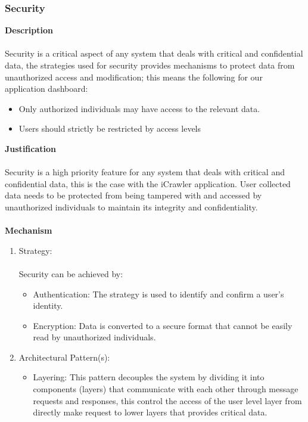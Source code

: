 \documentclass[hidelinks, 12pt, oneside]{article}
\begin{document}
			\subsubsection*{Security}
				\textbf{Description} \\\\
				Security is a critical aspect of any system that deals with critical and confidential data, the strategies used for security provides mechanisms to protect data from unauthorized access and modification; this means the following for our application dashboard:
				\begin{itemize}
					\item Only authorized individuals may have access to the relevant data.
					\item Users should strictly be restricted by access levels    
				\end{itemize}
				\textbf{Justification} \\\\
				Security is a high priority feature for any system that deals with critical and confidential data, this is the case with the iCrawler application. User collected data needs to be protected from being tampered with and accessed by unauthorized individuals to maintain its integrity and confidentiality.\\\\
				\textbf{Mechanism}
				\begin{enumerate}
					\item Strategy: \\\\
						Security can be achieved by:
						\begin{itemize}
							\item Authentication: The strategy is used to identify and confirm a user's identity.  
							\item Encryption: Data is converted to a secure format that cannot be easily read by unauthorized individuals. 
						\end{itemize}
					\item Architectural Pattern(s):
						\begin{itemize}
							\item Layering: This pattern decouples the system by dividing it into components (layers) that communicate with each other through message requests and responses, this control the access of the user level layer from directly make request to lower layers that provides critical data. 
						\end{itemize}
				\end{enumerate}		
\end{document}
